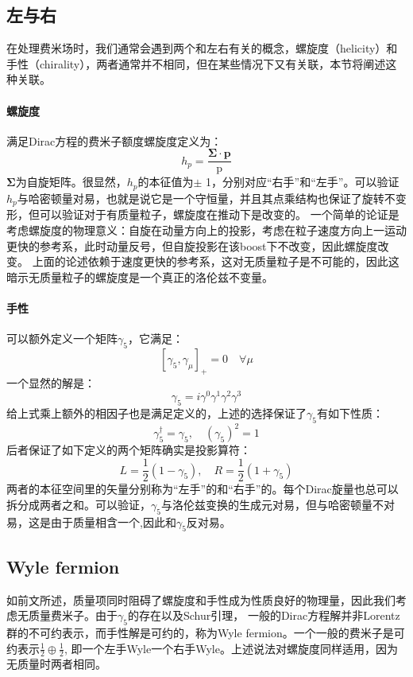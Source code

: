 \documentclass{article}
\begin{document}
\subsection{左与右}
在处理费米场时，我们通常会遇到两个和左右有关的概念，螺旋度（helicity）和手性（chirality），两者通常并不相同，但在某些情况下又有关联，本节将阐述这种关联。
\paragraph*{螺旋度}
满足Dirac方程的费米子额度螺旋度定义为：
\begin{equation}
  h_p=\frac{\mathbf{\Sigma} \cdot \mathbf{p}}{\mathrm{p}}
\end{equation}
$ \mathbf{\Sigma} $为自旋矩阵。很显然，$ h_p $的本征值为$ \pm $  1，分别对应“右手”和“左手”。可以验证  $ h_p $与哈密顿量对易，也就是说它是一个守恒量，并且其点乘结构也保证了旋转不变形，但可以验证对于有质量粒子，螺旋度在推动下是改变的。
一个简单的论证是考虑螺旋度的物理意义：自旋在动量方向上的投影，考虑在粒子速度方向上一运动更快的参考系，此时动量反号，但自旋投影在该boost下不改变，因此螺旋度改变。
上面的论述依赖于速度更快的参考系，这对无质量粒子是不可能的，因此这暗示无质量粒子的螺旋度是一个真正的洛伦兹不变量。
\paragraph*{手性}
可以额外定义一个矩阵$ \gamma_5 $，它满足：
\begin{equation}
  \left[\gamma_5, \gamma_\mu\right]_{+}=0 \quad \forall \mu
\end{equation} 
一个显然的解是：
\begin{equation}
  \gamma_5=i \gamma^0 \gamma^1 \gamma^2 \gamma^3
\end{equation}
给上式乘上额外的相因子也是满足定义的，上述的选择保证了$ \gamma_5 $有如下性质：
\begin{equation}
  \gamma_5^{\dagger}=\gamma_5, \quad\left(\gamma_5\right)^2=1
\end{equation} 
后者保证了如下定义的两个矩阵确实是投影算符：
\begin{equation}
  L=\frac{1}{2}\left(1-\gamma_5\right), \quad R=\frac{1}{2}\left(1+\gamma_5\right)
\end{equation}
两者的本征空间里的矢量分别称为“左手”的和“右手”的。每个Dirac旋量也总可以拆分成两者之和。可以验证，$ \gamma_5 $与洛伦兹变换的生成元对易，但与哈密顿量不对易，这是由于质量相含一个\gm ,因此和$ \gamma_5 $反对易。
\subsection{Wyle fermion}
如前文所述，质量项同时阻碍了螺旋度和手性成为性质良好的物理量，因此我们考虑无质量费米子。由于$ \gamma_5 $的存在以及Schur引理，
一般的Dirac方程解并非Lorentz群的不可约表示，而手性解是可约的，称为Wyle fermion。一个一般的费米子是可约表示$ \frac{1}{2}\oplus\frac{1}{2} $,
即一个左手Wyle一个右手Wyle。上述说法对螺旋度同样适用，因为无质量时两者相同。
\end{document}

